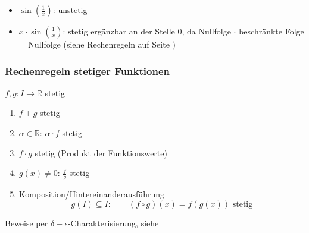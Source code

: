 \begin{example}
  \begin{itemize}
    \item $\sin(\frac 1 x)$: unstetig
    \begin{center}
    \end{center}

    \item $x \cdot \sin(\frac 1 x)$: stetig ergänzbar an der Stelle 0, da Nullfolge $\cdot$ beschränkte Folge = Nullfolge (siehe Rechenregeln auf Seite \pageref{ssub:nullfolgen})
    \begin{center}
    \end{center}
  \end{itemize}
\end{example}

\subsubsection*{Rechenregeln stetiger Funktionen}

$f, g: I \to \mathbb{R}$ stetig

\begin{enumerate}
  \item $f\pm g$ stetig
  \item $\alpha \in \mathbb{R}$: $\alpha \cdot f$ stetig
  \item $f \cdot g$ stetig (Produkt der Funktionswerte)
  \item $g(x) \neq 0$: $\frac f g$ stetig
  \item Komposition/Hintereinanderausführung
    \begin{equation*}
      g(I) \subseteq I: \qquad (f \circ g)(x) = f(g(x)) \text{ stetig}
    \end{equation*}
\end{enumerate}
%
Beweise per $\delta-\epsilon$-Charakterisierung, siehe \cite{bornemann}

